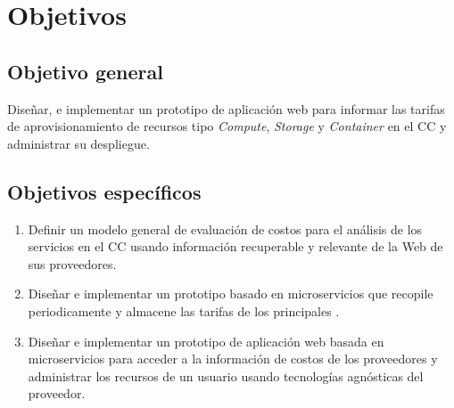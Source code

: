 \chapter{Objetivos} %

\label{ch:objetivos} %




\section{Objetivo general}
Diseñar, e implementar un prototipo de aplicación web para informar las tarifas de aprovisionamiento de recursos tipo \emph{Compute}, \emph{Storage} y \emph{Container} en el \acrshort{CC} y administrar su despliegue.\bigskip

\section{Objetivos específicos}
\begin{enumerate}
    \item Definir un modelo general de evaluación de costos para el análisis de los servicios en el \acrshort{CC} usando información recuperable y relevante de la Web de sus proveedores.
    
    \item Diseñar e implementar un prototipo basado en microservicios que recopile periodicamente y almacene las tarifas de los principales .
    
    \item Diseñar e implementar un prototipo de aplicación web basada en microservicios para acceder a la información de costos de los proveedores y administrar los recursos de un usuario usando tecnologías agnósticas del proveedor.
    
\end{enumerate}
